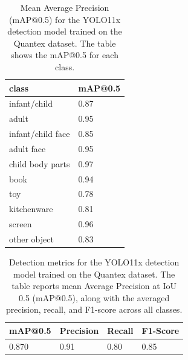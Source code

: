 \documentclass[
  man,floatsintext]{apa6}
\begin{document}
\begin{table}[tbp]

\begin{center}
\begin{threeparttable}

\caption{\label{tab:det-map_all}Mean Average Precision (mAP@0.5) for the YOLO11x detection model trained on the Quantex dataset. The table shows the mAP@0.5 for each class.}

\begin{tabular}{ll}
\toprule
class & \multicolumn{1}{c}{mAP@0.5}\\
\midrule
infant/child & 0.87\\
adult & 0.95\\
infant/child face & 0.85\\
adult face & 0.95\\
child body parts & 0.97\\
book & 0.94\\
toy & 0.78\\
kitchenware & 0.81\\
screen & 0.96\\
other object & 0.83\\
\bottomrule
\end{tabular}

\end{threeparttable}
\end{center}

\end{table}

\begin{table}[tbp]

\begin{center}
\begin{threeparttable}

\caption{\label{tab:det-detection-metrics-detailed}Detection metrics for the YOLO11x detection model trained on the Quantex dataset. The table reports mean Average Precision at IoU 0.5 (mAP@0.5), along with the averaged precision, recall, and F1-score across all classes.}

\begin{tabular}{llll}
\toprule
mAP@0.5 & \multicolumn{1}{c}{Precision} & \multicolumn{1}{c}{Recall} & \multicolumn{1}{c}{F1-Score}\\
\midrule
0.870 & 0.91 & 0.80 & 0.85\\
\bottomrule
\end{tabular}

\end{threeparttable}
\end{center}

\end{table}
\end{document}

